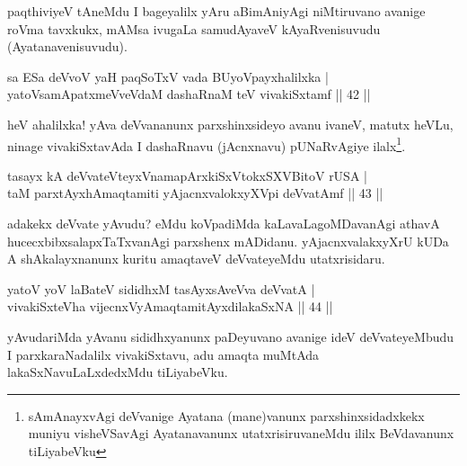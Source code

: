 \begin{artha}
paqthiviyeV tAneMdu I bageyalilx yAru aBimAniyAgi niMtiruvano avanige roVma tavxkukx, mAMsa ivugaLa samudAyaveV kAyaRvenisuvudu (Ayatanavenisuvudu).
\end{artha}


\begin{shl}
sa ESa deVvoV yaH paqSoTxV vada BUyoV\s payxhalilxka |\\
yatoV\s samApatxmeVveVdaM dashaRnaM teV vivakiSxtamf \hfill || 42 ||
\end{shl}

\begin{artha}
heV ahalilxka! yAva deVvananunx parxshinxsideyo avanu ivaneV, matutx heVLu, ninage vivakiSxtavAda I dashaRnavu (jAcnxnavu) pUNaRvAgiye ilalx\footnote[1]{sAmAnayxvAgi deVvanige Ayatana (mane)vanunx parxshinxsidadxkekx muniyu visheVSavAgi Ayatanavanunx utatxrisiruvaneMdu ililx BeVdavanunx tiLiyabeVku}.
\end{artha}


\begin{shl}
tasayx kA deVvateVteyxVnamapArxkiSxVtokxSXVBitoV rUSA |\\
taM parxtAyxhAmaqtamiti yAjacnxvalokxyXV\s pi deVvatAmf \hfill || 43 ||
\end{shl}

\begin{artha}%
adakekx deVvate yAvudu? eMdu koVpadiMda kaLavaLagoMDavanAgi athavA hucecxbibxsalapxTaTxvanAgi parxshenx mADidanu. yAjacnxvalakxyXrU kUDa A shAkalayxnanunx kuritu amaqtaveV deVvateyeMdu utatxrisidaru.
\end{artha}


\begin{shl}
yatoV yoV laBateV sididhxM tasAyxsAveVva deVvatA |\\
vivakiSxteVha vijecnxVyA\s maqtamitAyxdilakaSxNA \hfill || 44 ||
\end{shl}

\begin{artha}
yAvudariMda yAvanu sididhxyanunx paDeyuvano avanige ideV deVvateyeMbudu I parxkaraNadalilx vivakiSxtavu, adu amaqta muMtAda lakaSxNavuLaLxdedxMdu tiLiyabeVku.
\end{artha}

